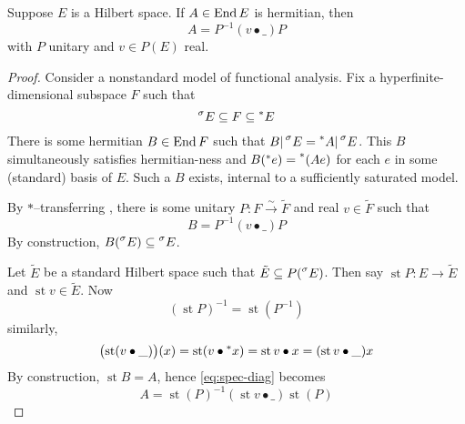\documentclass{scrartcl}
\newcommand{\hyper}[1]{\prescript{*}{}{#1}}
\newcommand{\standard}[1]{\prescript{\sigma}{}{#1}}
\DeclareMathOperator{\st}{st}
\begin{document}
\begin{theorem}
  Suppose $E$ is a Hilbert space. 
  If $A\in\operatorname{End} E$ is hermitian, then
  \[
    A = P^{-1}(v\bullet \_)P
  \]
  with $P$ unitary and $v\in P(E)$ real.
\end{theorem}
\begin{proof}
  Consider a nonstandard model of functional analysis. 
  Fix a hyperfinite-dimensional subspace $F$ such that
  \[
    \standard E \subseteq F \subseteq \hyper E
  \]
  There is some hermitian $B\in\operatorname{End} F$ such that $B|\standard E = \hyper A|\standard E$. This $B$ simultaneously satisfies hermitian-ness and $B(\hyper e)=\hyper(Ae)$ for each $e$ in some (standard) basis of $E$. Such a $B$ exists, internal to a sufficiently saturated model.

  By $*$--transferring , there is some unitary $P:F\xrightarrow{\sim} \tilde F$ and real $v\in \tilde F$ such that
  \begin{equation}
    B = P^{-1}(v\bullet\_)P
    \label{eq:spec-diag}
  \end{equation}
  By construction, $B(\standard E) \subseteq \standard E$.

  Let $\tilde E$ be a standard Hilbert space such that $\tilde E \subseteq P(\standard E)$. Then say $\st P: E \to \tilde E$ and $\st v \in \tilde E$. 
  Now
  \[
    (\st P)^{-1}=\st(P^{-1})
  \]
  similarly,
  \[
    \bigl(\st(v\bullet\_)\bigr)(x)=\st(v\bullet\hyper x) = \st v\bullet x = (\st v\bullet\_)x
  \]
  By construction, $\st B=A$, hence \cref{eq:spec-diag} becomes
  \[
    A=\st(P)^{-1} (\st v\bullet\_) \st(P)
  \]
\end{proof}
\end{document}
